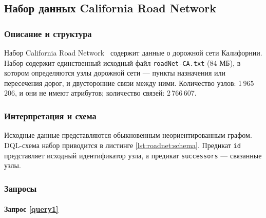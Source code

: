 
\subsection{Набор данных California Road Network}

\subsubsection{Описание и структура}

Набор California Road Network~\cite{roadnet} содержит данные о дорожной сети Калифорнии. Набор содержит единственный
исходный файл \texttt{roadNet-CA.txt} (84 МБ), в котором определяются узлы дорожной сети --- пункты назначения или
пересечения дорог, и двусторонние связи между ними. Количество узлов: 1\,965\,206, и они не имеют атрибутов;
количество связей: 2\,766\,607.

\subsubsection{Интерпретация и схема}

Исходные данные представляются обыкновенным неориентированным графом. DQL-схема набор приводится в
листинге \ref{lst:roadnet:schema}. Предикат \texttt{id} представляет исходный идентификатор узла, а предикат
\texttt{successors} --- связанные узлы.


\subsubsection{Запросы}

\paragraph{Запрос \ref{query1}}

